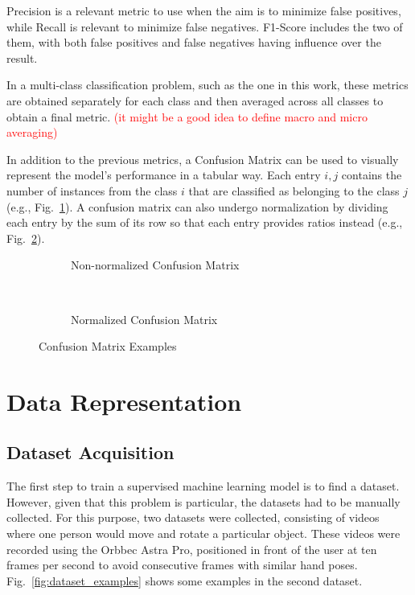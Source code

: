 Precision is a relevant metric to use when the aim is to minimize false positives, while Recall is relevant to minimize false negatives. F1-Score includes the two of them, with both false positives and false negatives having influence over the result.

In a multi-class classification problem, such as the one in this work, these metrics are obtained separately for each class and then averaged across all classes to obtain a final metric. \textcolor{red}{(it might be a good idea to define macro and micro averaging)}

In addition to the previous metrics, a Confusion Matrix can be used to visually represent the model's performance in a tabular way. Each entry $i,j$ contains the number of instances from the class $i$ that are classified as belonging to the class $j$ (e.g., Fig.~\ref{fig:non-norm_conf_matrix}). A confusion matrix can also undergo normalization by dividing each entry by the sum of its row so that each entry provides ratios instead (e.g., Fig.~\ref{fig:norm_conf_matrix}).

\begin{figure}[H]
    \centering
    \begin{subfigure}[b]{0.48\textwidth}
        {\fontsize{10}{12}\selectfont}
        \caption{Non-normalized Confusion Matrix}
        \label{fig:non-norm_conf_matrix}
    \end{subfigure} \
    \begin{subfigure}[b]{0.48\textwidth}
        {\fontsize{10}{12}\selectfont}
        \caption{Normalized Confusion Matrix}
        \label{fig:norm_conf_matrix}
    \end{subfigure}
    \caption[Confusion Matrix Examples]{Confusion Matrix Examples}
    \label{fig:conf_matrix_examples}
\end{figure}

\section{Data Representation}
\label{section:data_representation}

\subsection{Dataset Acquisition}

The first step to train a supervised machine learning model is to find a dataset. However, given that this problem is particular, the datasets had to be manually collected. For this purpose, two datasets were collected, consisting of videos where one person would move and rotate a particular object. These videos were recorded using the Orbbec Astra Pro, positioned in front of the user at ten frames per second to avoid consecutive frames with similar hand poses. Fig.~\ref{fig:dataset_examples} shows some examples in the second dataset.

